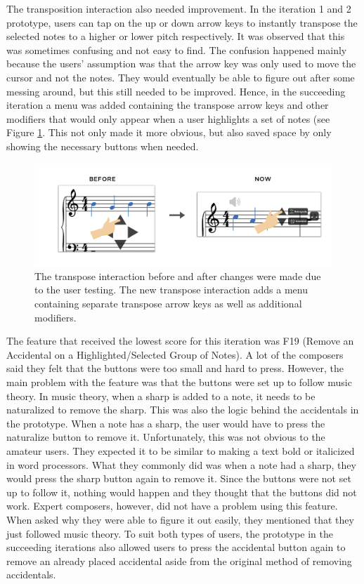 			The transposition interaction also needed improvement. In the iteration 1 and 2 prototype, users can tap on the up or down arrow keys to instantly transpose the selected notes to a higher or lower pitch respectively. It was observed that this was sometimes confusing and not easy to find. The confusion happened mainly because the users' assumption was that the arrow key was only used to move the cursor and not the notes. They would eventually be able to figure out after some messing around, but this still needed to be improved. Hence, in the succeeding iteration a menu was added containing the transpose arrow keys and other modifiers that would only appear when a user highlights a set of notes (see Figure \ref{fig:transpose}. This not only made it more obvious, but also saved space by only showing the necessary buttons when needed.

			\begin{figure}[h]
				\centering
				\includegraphics[scale=0.25]{figures/before-after-transpose-notes}
			    \caption{The transpose interaction before and after changes were made due to the user testing. The new transpose interaction adds a menu containing separate transpose arrow keys as well as additional modifiers.}
			    \label{fig:transpose}
			\end{figure}

			The feature that received the lowest score for this iteration was F19 (Remove an Accidental on a Highlighted/Selected Group of Notes). A lot of the composers said they felt that the buttons were too small and hard to press. However, the main problem with the feature was that the buttons were set up to follow music theory. In music theory, when a sharp is added to a note, it needs to be naturalized to remove the sharp. This was also the logic behind the accidentals in the prototype. When a note has a sharp, the user would have to press the naturalize button to remove it. Unfortunately, this was not obvious to the amateur users. They expected it to be similar to making a text bold or italicized in word processors. What they commonly did was when a note had a sharp, they would press the sharp button again to remove it. Since the buttons were not set up to follow it, nothing would happen and they thought that the buttons did not work. Expert composers, however, did not have a problem using this feature. When asked why they were able to figure it out easily, they mentioned that they just followed music theory. To suit both types of users, the prototype in the succeeding iterations also allowed users to press the accidental button again to remove an already placed accidental aside from the original method of removing accidentals.

